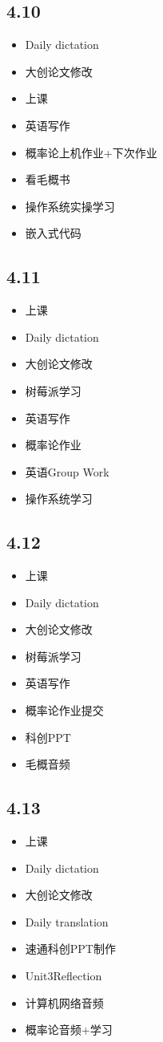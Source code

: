 \documentclass[UTF8]{ctexart}
\begin{document}
\subsection*{4.10}
\begin{itemize}
    \item Daily dictation
    \item 大创论文修改
    \item 上课
    \item 英语写作
    \item 概率论上机作业+下次作业
    \item 看毛概书
    \item 操作系统实操学习
    \item 嵌入式代码
\end{itemize}
\subsection*{4.11}
\begin{itemize}
    \item 上课
    \item Daily dictation
    \item 大创论文修改
    \item 树莓派学习
    \item 英语写作
    \item 概率论作业
    \item 英语Group Work
    \item 操作系统学习
\end{itemize}
\subsection*{4.12}
\begin{itemize}
    \item 上课
    \item Daily dictation
    \item 大创论文修改
    \item 树莓派学习
    \item 英语写作
    \item 概率论作业提交
    \item 科创PPT
    \item 毛概音频
\end{itemize}
\subsection*{4.13}
\begin{itemize}
    \item 上课
    \item Daily dictation
    \item 大创论文修改
    \item Daily translation
    \item 速通科创PPT制作
    \item Unit3Reflection
    \item 计算机网络音频
    \item 概率论音频+学习
\end{itemize}
\end{document}
